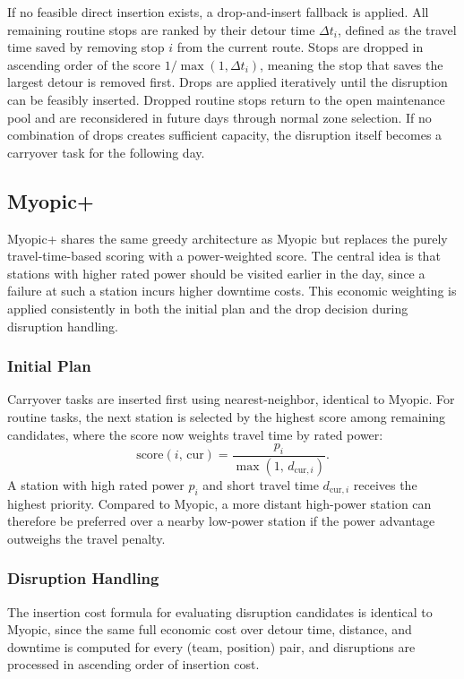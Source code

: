 \documentclass[12pt,oneside]{article}
\begin{document}
If no feasible direct insertion exists, a drop-and-insert fallback is applied. All remaining routine stops are ranked by their detour time $\Delta t_i$, defined as the travel time saved by removing stop $i$ from the current route. Stops are dropped in ascending order of the score $1 / \max(1, \Delta t_i)$, meaning the stop that saves the largest detour is removed first. Drops are applied iteratively until the disruption can be feasibly inserted. Dropped routine stops return to the open maintenance pool and are reconsidered in future days through normal zone selection. If no combination of drops creates sufficient capacity, the disruption itself becomes a carryover task for the following day.

\subsection{Myopic+}\label{subsec_myopic}
Myopic+ shares the same greedy architecture as Myopic but replaces the purely travel-time-based scoring with a power-weighted score. The central idea is that stations with higher rated power should be visited earlier in the day, since a failure at such a station incurs higher downtime costs. This economic weighting is applied consistently in both the initial plan and the drop decision during disruption handling.

\subsubsection*{Initial Plan}
Carryover tasks are inserted first using nearest-neighbor, identical to Myopic. For routine tasks, the next station is selected by the highest score among remaining candidates, where the score now weights travel time by rated power:
\[
  \text{score}(i,\, \mathrm{cur}) = \frac{p_i}{\max(1,\, d_{\mathrm{cur},i})}.
\]
A station with high rated power $p_i$ and short travel time $d_{\mathrm{cur},i}$ receives the highest priority. Compared to Myopic, a more distant high-power station can therefore be preferred over a nearby low-power station if the power advantage outweighs the travel penalty.

\subsubsection*{Disruption Handling}
The insertion cost formula for evaluating disruption candidates is identical to Myopic, since the same full economic cost over detour time, distance, and downtime is computed for every (team, position) pair, and disruptions are processed in ascending order of insertion cost.
\end{document}
